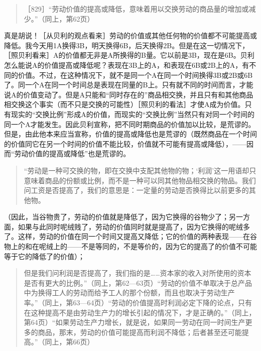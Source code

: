 \begin{quote}{［829］“劳动价值的提高或降低，意味着用以交换劳动的商品量的增加或减少。”（同上，第62页）}\end{quote}

真是胡说！［从贝利的观点看来］劳动的价值或其他任何物的价值都不可能提高或降低。我今天用1A换得3B，明天换得6B，后天换得2B。但是在这一切情况下，［照贝利看来］A的价值都无非是A所换得的B量。它以前是3B，现在是6B。贝利怎么能说A的价值提高或降低呢？表现在3B上的A，和表现在6B或2B上的A，有不同的价值。不过，在这种情况下，就不是同一个A在同一个时间换得3B或2B或6B了。同一个A在同一个时间总是表现在同量的B上。只有就不同的时间而言，才能说A的价值变动了。但是A只能和“同时存在的”商品相交换，并且只有和其他商品相交换这个事实（而不只是交换的可能性）［照贝利的看法］才使A成为价值。只有现实的“交换比例”形成A的价值，而现实的“交换比例”当然只有对同一个时间的同一个A才能发生。因此贝利宣称，把不同时期商品的价值加以比较，是荒谬的。但是，由此他本来应当宣称，价值的提高或降低也是荒谬的（既然商品在一个时间的价值同它在另一个时间的价值不能比较，价值就不可能有提高或降低），——因而“劳动价值的提高或降低”也是荒谬的。

\begin{quote}{“劳动是一种可交换的物，即在交换中支配其他物的物；‘利润’这一用语却只意味着商品的份额或比例，而不是一种可以同其他物品相交换的物品。我们问工资是否提高了，我们的意思是：一定量的劳动是否换得比以前更多的其他物。}\end{quote}

（因此，当谷物贵了，劳动的价值就是降低了，因为它换得的谷物少了；另一方面，如果与此同时呢绒贱了，劳动的价值同时就是提高了，因为它换得的呢绒多了。这样，劳动的价值在同一个时间又提高又降低；它的价值的两种表现——在谷物上的和在呢绒上的——不是等同的，不是等价的，因为它的提高了的价值不可能等于它的降低了的价值）；

\begin{quote}{但是我们问利润是否提高了，我们指的是……资本家的收入对所使用的资本是否有更大的比例。”（同上，第62—63页）“劳动的价值不单取决于总产品中为换得工人的劳动而给予工人的那个份额，而且也取决于劳动生产率。”（同上，第63—64页）“劳动的价值提高时利润必定下降的论点，只有在这种提高不是由劳动生产力的增长引起的情况下，才是正确的。”（同上，第64页）“如果劳动生产力增长，就是说，如果同一劳动在同一时间生产更多的商品，那末，劳动的价值可能提高而利润不降低；后者甚至还可能提高。”（同上，第66页）}\end{quote}

